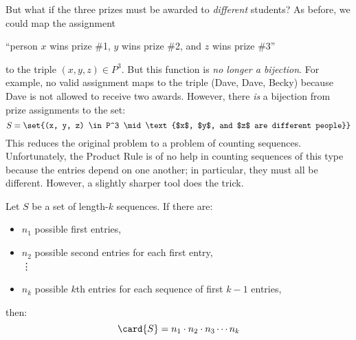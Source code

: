 But what if the three prizes must be awarded to \emph{different}
students?  As before, we could map the assignment
%
\begin{center}
``person $x$ wins prize \#1, $y$ wins prize \#2, and $z$ wins prize \#3''
\end{center}
%
to the triple $(x, y, z) \in P^3$.  But this function is \emph{no longer
a bijection}.  For example, no valid assignment maps to the triple (Dave,
Dave, Becky) because Dave is not allowed to receive two awards.  However,
there \emph{is} a bijection from prize assignments to the set:
%
\[
S = \set{(x, y, z) \in P^3 \mid \text{$x$, $y$, and $z$ are different people}}
\]
%
This reduces the original problem to a problem of counting sequences.
Unfortunately, the Product Rule is of no help in counting sequences of
this type because the entries depend on one another; in particular,
they must all be different.  However, a slightly sharper tool does the
trick.


\begin{rul}
Let $S$ be a set of length-$k$ sequences.  If there are:
%
\begin{itemize}
\item $n_1$ possible first entries,
\item $n_2$ possible second entries for each first entry,\\
\iffalse
\item $n_3$ possible third entries for each sequence of first and
second entries,\\
\fi
\vdots
\item $n_k$ possible $k$th entries for each sequence of first $k-1$
  entries,
\end{itemize}
%
then:
%
\[
\card{S} = n_1 \cdot n_2 \cdot n_3 \cdots n_k
\]
\end{rul}

